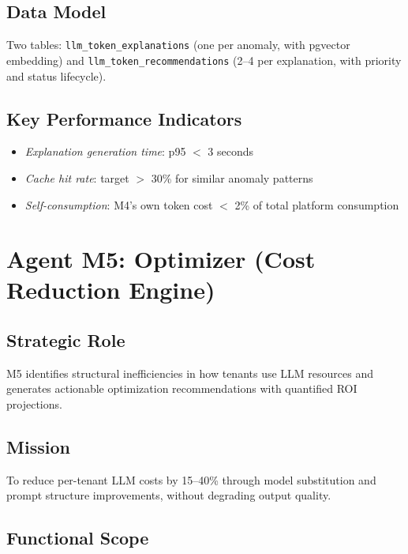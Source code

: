 \documentclass[12pt,a4paper,twoside]{report}
\newcommand{\kpi}[1]{\textit{\textcolor{accentgreen}{#1}}}
\begin{document}
\subsection{Data Model}
Two tables: \texttt{llm\_token\_explanations} (one per anomaly, with pgvector embedding) and \texttt{llm\_token\_recommendations} (2--4 per explanation, with priority and status lifecycle).

\subsection{Key Performance Indicators}
\begin{itemize}
  \item \kpi{Explanation generation time}: p95 $<$ 3 seconds
  \item \kpi{Cache hit rate}: target $>$ 30\% for similar anomaly patterns
  \item \kpi{Self-consumption}: M4's own token cost $<$ 2\% of total platform consumption
\end{itemize}

\section{Agent M5: Optimizer (Cost Reduction Engine)}

\subsection{Strategic Role}
M5 identifies structural inefficiencies in how tenants use LLM resources and generates actionable optimization recommendations with quantified ROI projections.

\subsection{Mission}
To reduce per-tenant LLM costs by 15--40\% through model substitution and prompt structure improvements, without degrading output quality.

\subsection{Functional Scope}
\end{document}
